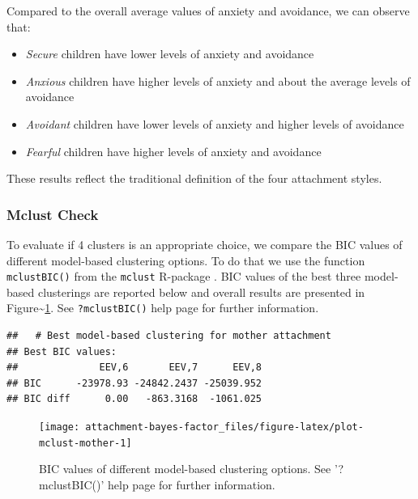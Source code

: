 \documentclass[
]{book}
\providecommand{\tightlist}{%
  \setlength{\itemsep}{0pt}\setlength{\parskip}{0pt}}
\begin{document}
Compared to the overall average values of anxiety and avoidance, we can observe that:

\begin{itemize}
\tightlist
\item
  \emph{Secure} children have lower levels of anxiety and avoidance
\item
  \emph{Anxious} children have higher levels of anxiety and about the average levels of avoidance
\item
  \emph{Avoidant} children have lower levels of anxiety and higher levels of avoidance
\item
  \emph{Fearful} children have higher levels of anxiety and avoidance
\end{itemize}

These results reflect the traditional definition of the four attachment styles.

\hypertarget{mclust-check}{%
\subsubsection*{Mclust Check}\label{mclust-check}}

To evaluate if 4 clusters is an appropriate choice, we compare the BIC values of different model-based clustering options. To do that we use the function \texttt{mclustBIC()} from the \texttt{mclust} R-package \citep{scruccaMclustClusteringClassification2016}. BIC values of the best three model-based clusterings are reported below and overall results are presented in Figure\textasciitilde\ref{fig:plot-mclust-mother}. See \texttt{?mclustBIC()} help page for further information.

\begin{verbatim}
##   # Best model-based clustering for mother attachment
## Best BIC values:
##              EEV,6       EEV,7      EEV,8
## BIC      -23978.93 -24842.2437 -25039.952
## BIC diff      0.00   -863.3168  -1061.025
\end{verbatim}

\begin{figure}

{\centering \texttt{[image: attachment-bayes-factor\_files/figure-latex/plot-mclust-mother-1]} 

}

\caption{BIC values of different model-based clustering options. See '?mclustBIC()' help page for further information.}\label{fig:plot-mclust-mother}
\end{figure}
\end{document}
